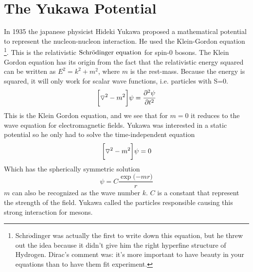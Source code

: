 %
%
%
%
%








\section{The Yukawa Potential} 
%
In 1935 the japanese physicist Hideki Yukawa proposed a mathematical potential to represent the nucleon-nucleon interaction.
He used the Klein-Gordon equation
\footnote{ Schr$\ddot{o}$dinger was actually the first to write down this equation, but he threw out the idea because
it didn't give him the right hyperfine structure of Hydrogen. Dirac's comment was: it's more important to have 
beauty in your equations than to have them fit experiment.}. 
This is the relativistic $\text{Schr$\ddot{\textrm{o}}$dinger equation}$ for spin-$0$ bosons. 
The Klein Gordon equation has its origin from the fact that the relativistic energy squared can be written as $E^2={k^2+m^2}$,
where $m$ is the rest-mass. Because the energy is squared, it will only work for scalar wave functions, i.e. particles with S=0. 
\begin{equation}
\bigg[{\bf \triangledown }^2-m^2\bigg]\psi = \frac{\partial ^2\psi}{\partial t^2}
\end{equation}
%
This is the Klein Gordon equation, and we see that for $m=0$ it reduces to the wave equation for electromagnetic fields.
Yukawa was interested in a static potential so he only had to solve the time-independent equation
\begin{equation}
\bigg[{\bf \triangledown }^2-m^2\bigg]\psi = 0
\end{equation}
%
Which has the spherically symmetric solution
\begin{equation}
\psi=C\frac{\exp ({-{ m r})}}{{ r}}
\end{equation}
%
$m$ can also be recognized as the wave number $k$. $C$ is a constant that represent 
the strength of the field. 
Yukawa called the particles responsible causing this strong interaction for mesons.

